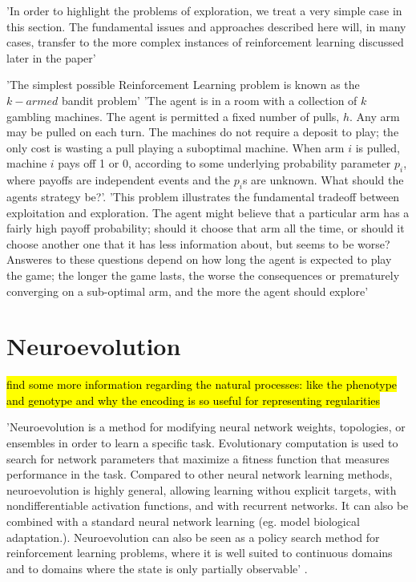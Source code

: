 'In order to highlight the problems of exploration, we treat a very simple case in this section. The fundamental issues and approaches described here will, in many cases, transfer to the more complex instances of reinforcement learning discussed later in the paper' \cite{KaelblingLittmanMoore1996}

'The simplest possible Reinforcement Learning problem is known as the $k-armed$ bandit problem' \cite{KaelblingLittmanMoore1996}
'The agent is in a room with a collection of $k$ gambling machines. The agent is permitted a fixed number of pulls, $h$. Any arm may be pulled on each turn. The machines do not require a deposit to play; the only cost is wasting a pull playing a suboptimal machine. When arm $i$ is pulled, machine $i$ pays off 1 or 0, according to some underlying probability parameter $p_i$, where payoffs are independent events and the $p_i$s are unknown. What should the agents strategy be?'\cite{KaelblingLittmanMoore1996}.
'This problem illustrates the fundamental tradeoff between exploitation and exploration. The agent might believe that a particular arm has a fairly high payoff probability; should it choose that arm all the time, or should it choose another one that it has less information about, but seems to be worse? Answeres to these questions depend on how long the agent is expected to play the game; the longer the game lasts, the worse the consequences or prematurely converging on a sub-optimal arm, and the more the agent should explore'



\section{Neuroevolution}

\hl{find some more information regarding the natural processes: like the phenotype and genotype and why the encoding is so useful for representing regularities}

'Neuroevolution is a method for modifying neural network weights, topologies, or ensembles in order to learn a specific task. Evolutionary computation is used to search for network parameters that maximize a fitness function that measures performance in the task. Compared to other neural network learning methods, neuroevolution is highly general, allowing learning withou explicit targets, with nondifferentiable activation functions, and with recurrent networks. It can also be combined with a standard neural network learning (eg. model biological adaptation.). Neuroevolution can also be seen as a policy search method for reinforcement learning problems, where it is well suited to continuous domains and to domains where the state is only partially observable' \cite{Miikkulainen2010}.

